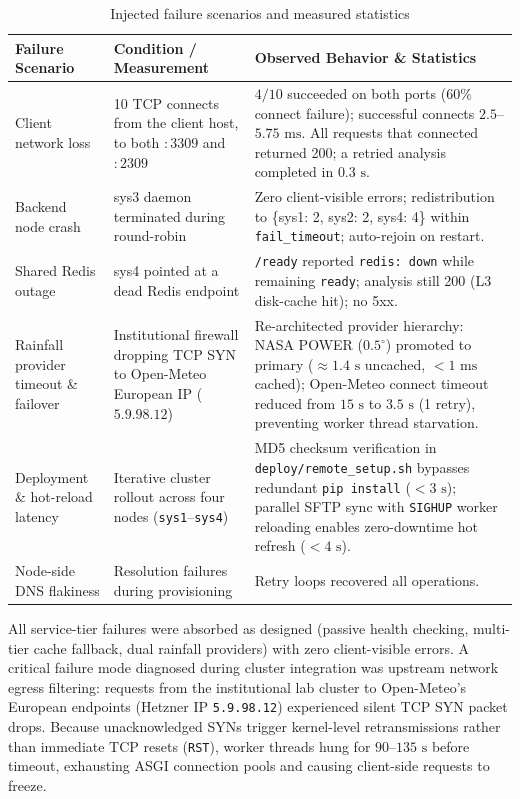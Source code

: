 \documentclass[manuscript,screen,review]{acmart}
\begin{document}
\begin{table}[h]
  \caption{Injected failure scenarios and measured statistics}
  \label{tab:failures}
  \begin{tabular}{p{3.0cm}p{4.0cm}p{6.6cm}}
    \toprule
    Failure Scenario & Condition / Measurement & Observed Behavior \& Statistics \\
    \midrule
    Client network loss & 10 TCP connects from the client host, to both $:3309$ and $:2309$ & $4/10$ succeeded on both ports ($60\%$ connect failure); successful connects $2.5$--$5.75\text{ ms}$. All requests that connected returned 200; a retried analysis completed in $0.3\text{ s}$. \\
    Backend node crash & sys3 daemon terminated during round-robin & Zero client-visible errors; redistribution to \{sys1: 2, sys2: 2, sys4: 4\} within \texttt{fail\_timeout}; auto-rejoin on restart. \\
    Shared Redis outage & sys4 pointed at a dead Redis endpoint & \texttt{/ready} reported \texttt{redis: down} while remaining \texttt{ready}; analysis still 200 (L3 disk-cache hit); no 5xx. \\
    Rainfall provider timeout \& failover & Institutional firewall dropping TCP SYN to Open-Meteo European IP ($5.9.98.12$) & Re-architected provider hierarchy: NASA POWER ($0.5^\circ$) promoted to primary ($\approx 1.4\text{ s}$ uncached, $<1\text{ ms}$ cached); Open-Meteo connect timeout reduced from $15\text{ s}$ to $3.5\text{ s}$ (1 retry), preventing worker thread starvation. \\
    Deployment \& hot-reload latency & Iterative cluster rollout across four nodes (\texttt{sys1}--\texttt{sys4}) & MD5 checksum verification in \texttt{deploy/remote\_setup.sh} bypasses redundant \texttt{pip install} ($<3\text{ s}$); parallel SFTP sync with \texttt{SIGHUP} worker reloading enables zero-downtime hot refresh ($<4\text{ s}$). \\
    Node-side DNS flakiness & Resolution failures during provisioning & Retry loops recovered all operations. \\
    \bottomrule
  \end{tabular}
\end{table}

All service-tier failures were absorbed as designed (passive health checking, multi-tier cache fallback, dual rainfall providers) with zero client-visible errors. A critical failure mode diagnosed during cluster integration was upstream network egress filtering: requests from the institutional lab cluster to Open-Meteo's European endpoints (Hetzner IP \texttt{5.9.98.12}) experienced silent TCP SYN packet drops. Because unacknowledged SYNs trigger kernel-level retransmissions rather than immediate TCP resets (\texttt{RST}), worker threads hung for $90$--$135\text{ s}$ before timeout, exhausting ASGI connection pools and causing client-side requests to freeze.
\end{document}
